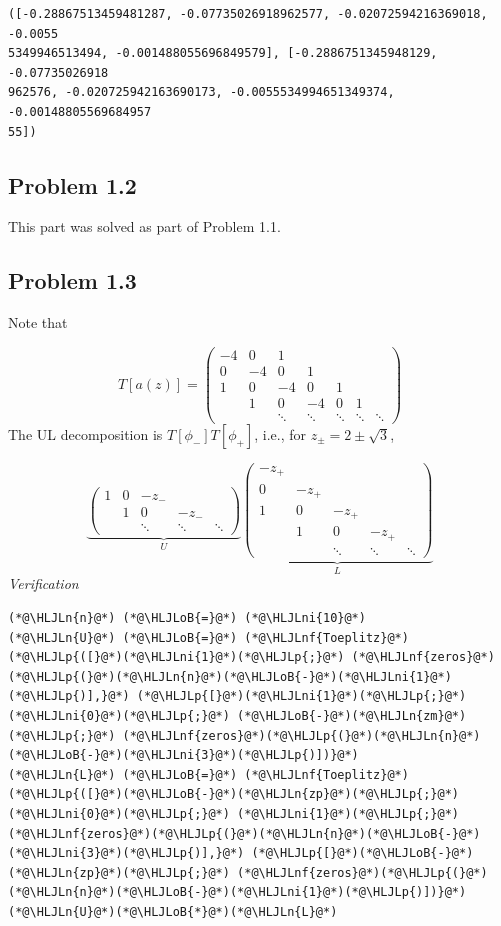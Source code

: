 \documentclass[12pt,a4paper]{article}
\newcommand{\HLJLn}[1]{#1}
\newcommand{\HLJLnf}[1]{\textcolor[RGB]{66,102,213}{#1}}
\newcommand{\HLJLni}[1]{\textcolor[RGB]{59,151,46}{#1}}
\newcommand{\HLJLoB}[1]{\textcolor[RGB]{102,102,102}{\textbf{#1}}}
\newcommand{\HLJLp}[1]{#1}
\def\sopmatrix#1{ \begin{pmatrix}#1\end{pmatrix} }
\begin{document}
\begin{lstlisting}
([-0.28867513459481287, -0.07735026918962577, -0.02072594216369018, -0.0055
5349946513494, -0.001488055696849579], [-0.2886751345948129, -0.07735026918
962576, -0.020725942163690173, -0.0055534994651349374, -0.00148805569684957
55])
\end{lstlisting}


\subsection{Problem 1.2}
This part was solved as part of Problem 1.1.

\subsection{Problem 1.3}
Note that

\[
T[a(z)] = \sopmatrix{
-4 & 0 & 1 \\ 
0 & -4 & 0 & 1 \\
1 & 0 & -4 & 0 & 1 \\
& 1& 0 & -4 & 0 & 1 \\
&&\ddots &\ddots &\ddots &\ddots &\ddots 
}
\]
The UL decomposition is $T[\phi_-] T[\phi_+]$, i.e., for $z_{\pm} = 2 \pm \sqrt3$,

\[
\underbrace{\sopmatrix{
1 & 0 & -z_- \\
& 1 & 0 & -z_- \\
&&\ddots & \ddots & \ddots 
}}_U
\underbrace{\sopmatrix{-z_+ \\
0 & -z_+ \\
1 & 0 & -z_+ \\
& 1 & 0 & -z_+ \\
&&\ddots & \ddots & \ddots
}}_L
\]
\emph{Verification}


\begin{lstlisting}
(*@\HLJLn{n}@*) (*@\HLJLoB{=}@*) (*@\HLJLni{10}@*)
(*@\HLJLn{U}@*) (*@\HLJLoB{=}@*) (*@\HLJLnf{Toeplitz}@*)(*@\HLJLp{([}@*)(*@\HLJLni{1}@*)(*@\HLJLp{;}@*) (*@\HLJLnf{zeros}@*)(*@\HLJLp{(}@*)(*@\HLJLn{n}@*)(*@\HLJLoB{-}@*)(*@\HLJLni{1}@*)(*@\HLJLp{)],}@*) (*@\HLJLp{[}@*)(*@\HLJLni{1}@*)(*@\HLJLp{;}@*) (*@\HLJLni{0}@*)(*@\HLJLp{;}@*) (*@\HLJLoB{-}@*)(*@\HLJLn{zm}@*)(*@\HLJLp{;}@*) (*@\HLJLnf{zeros}@*)(*@\HLJLp{(}@*)(*@\HLJLn{n}@*)(*@\HLJLoB{-}@*)(*@\HLJLni{3}@*)(*@\HLJLp{)])}@*)
(*@\HLJLn{L}@*) (*@\HLJLoB{=}@*) (*@\HLJLnf{Toeplitz}@*)(*@\HLJLp{([}@*)(*@\HLJLoB{-}@*)(*@\HLJLn{zp}@*)(*@\HLJLp{;}@*) (*@\HLJLni{0}@*)(*@\HLJLp{;}@*) (*@\HLJLni{1}@*)(*@\HLJLp{;}@*) (*@\HLJLnf{zeros}@*)(*@\HLJLp{(}@*)(*@\HLJLn{n}@*)(*@\HLJLoB{-}@*)(*@\HLJLni{3}@*)(*@\HLJLp{)],}@*) (*@\HLJLp{[}@*)(*@\HLJLoB{-}@*)(*@\HLJLn{zp}@*)(*@\HLJLp{;}@*) (*@\HLJLnf{zeros}@*)(*@\HLJLp{(}@*)(*@\HLJLn{n}@*)(*@\HLJLoB{-}@*)(*@\HLJLni{1}@*)(*@\HLJLp{)])}@*)
(*@\HLJLn{U}@*)(*@\HLJLoB{*}@*)(*@\HLJLn{L}@*)
\end{lstlisting}
\end{document}
